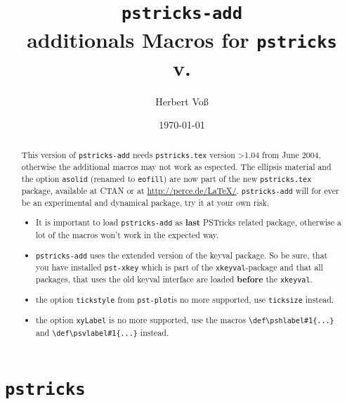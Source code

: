 \title{\texttt{pstricks-add}\\additionals Macros for \texttt{pstricks}%
\\
    \small v.\pstricksaddFV}
\author{Herbert Vo\ss}
\date{\today}

\maketitle

\begin{abstract}
This version of \verb+pstricks-add+ needs \verb+pstricks.tex+ version >1.04 from June 2004,
otherwise the additional macros may not work as espected. The ellipsis
material and the option \verb+asolid+ (renamed to \verb+eofill+) are 
now part of the new \verb+pstricks.tex+ package, available at CTAN or at
\url{http://perce.de/LaTeX/}. \verb+pstricks-add+ will for ever be an experimental and
dynamical package, try it at your own risk.
 
\begin{itemize}
\item It is important to load \verb+pstricks-add+ as \textbf{last} PSTricks related package, otherwise
a lot of the macros won't work in the expected way. 
\item \verb+pstricks-add+ uses the extended version of the keyval package. So be sure, that
you have installed \verb+pst-xkey+ which is part of the \verb+xkeyval+-package and that all
packages, that uses the old keyval interface are loaded \textbf{before} the \verb+xkeyval+.\cite{xkeyval}
\item the option \verb+tickstyle+ from \verb+pst-plot+is no more supported, use \verb+ticksize+ instead.
\item the option \verb+xyLabel+ is no more supported, use the macros \verb+\def\pshlabel#1{...}+ and
    \verb+\def\psvlabel#1{...}+ instead.
\end{itemize}

\end{abstract}

\clearpage
\tableofcontents

\clearpage
\part{\texttt{pstricks}}




